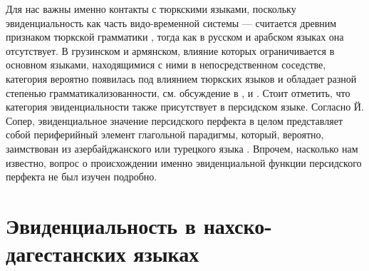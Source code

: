 \par Для нас важны именно контакты с тюркскими языками, поскольку эвиденциальность как часть видо-временной системы --- считается древним признаком тюркской грамматики \citep[127]{friedman2018}, тогда как в русском и арабском языках она отсутствует. В грузинском и армянском, влияние которых ограничивается в основном языками, находящимися с ними в непосредственном соседстве, категория вероятно появилась под влиянием тюркских языков и обладает разной степенью грамматикализованности, см. обсуждение в \citep{boeder2000}, \citep{kozintseva2000} и \citep{donabedian2001}. Стоит отметить, что категория эвиденциальности также присутствует в персидском языке. Согласно Й. Сопер, эвиденциальное значение персидского перфекта в целом представляет собой периферийный элемент глагольной парадигмы, который, вероятно, заимствован из азербайджанского или турецкого языка \citep[356--358]{soper1987}. Впрочем, насколько нам известно, вопрос о происхождении именно эвиденциальной функции персидского перфекта не был изучен подробно.

\section{Эвиденциальность в нахско-дагестанских языках} \label{sec:ndevid}

